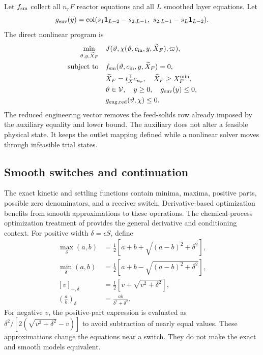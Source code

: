 Let $f_{\rm sm}$ collect all $n_rF$ reactor equations and all $L$ smoothed layer equations. Let
\begin{equation}
g_{\rm env}(y)=\operatorname{col}
(s_1\mathbf1_{L-2}-s_{2:L-1},\ s_{2:L-1}-s_L\mathbf1_{L-2}).
\end{equation}
The direct nonlinear program is
\begin{equation}
\begin{aligned}
\min_{\vartheta,y,\widetilde X_F}\quad&J(\vartheta,\chi(\vartheta,c_{\rm in},y,\widetilde X_F),\varpi),\\
\text{subject to}\quad&f_{\rm sm}(\vartheta,c_{\rm in},y,\widetilde X_F)=0,\\
&\widetilde X_F=t_X^\top c_{n_r},\quad\widetilde X_F\ge X_F^{\min},\\
&\vartheta\in\mathcal V,\quad y\ge0,\quad g_{\rm env}(y)\le0,\\
&g_{{\rm eng},\rm red}(\vartheta,\chi)\le0.
\end{aligned}
\label{eq:plant_direct_optimization}
\end{equation}
The reduced engineering vector removes the feed-solids row already imposed by the auxiliary equality and lower bound. The auxiliary does not alter a feasible physical state. It keeps the outlet mapping defined while a nonlinear solver moves through infeasible trial states.

\subsection{Smooth switches and continuation}

The exact kinetic and settling functions contain minima, maxima, positive parts, possible zero denominators, and a receiver switch. Derivative-based optimization benefits from smooth approximations to these operations. The chemical-process optimization treatment of \citet{BuzziFerraris2013} provides the general derivative and conditioning context. For positive width $\delta=\epsilon S$, define
\begin{align}
\max_\delta(a,b)&=\tfrac12\left[a+b+\sqrt{(a-b)^2+\delta^2}\right],\\
\min_\delta(a,b)&=\tfrac12\left[a+b-\sqrt{(a-b)^2+\delta^2}\right],\\
[v]_{+,\delta}&=\tfrac12\left[v+\sqrt{v^2+\delta^2}\right],\\
\left(\frac ab\right)_\delta&=\frac{ab}{b^2+\delta^2}.
\label{eq:plant_smooth_operations}
\end{align}
For negative $v$, the positive-part expression is evaluated as $\delta^2/[2(\sqrt{v^2+\delta^2}-v)]$ to avoid subtraction of nearly equal values. These approximations change the equations near a switch. They do not make the exact and smooth models equivalent.


